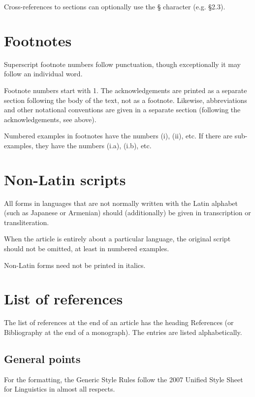 \documentclass[a4paper]{article}
\newcommand{\gsrex}[1]{{\color{blue}#1}}
\begin{document}
Cross-references to sections can optionally use the \gsrex{§}
character (e.g. \gsrex{§2.3}).

\section{Footnotes}\label{sec:footnotes}

Superscript footnote numbers follow punctuation, though exceptionally it
may follow an individual word.

Footnote numbers start with \gsrex{1}. The
acknowledgements are printed as a separate section following the body of
the text, not as a footnote. Likewise, abbreviations and other
notational conventions are given in a separate section (following the
acknowledgements, see  above).

Numbered examples in footnotes have the
numbers \gsrex{(i)}, 
\gsrex{(ii)}, etc. If there are sub- examples, they have the
numbers \gsrex{(i.a)}, 
\gsrex{(i.b)}, etc.

\section{Non-Latin scripts}\label{sec:non-latin-scripts}

All forms in languages that are not normally written with the Latin
alphabet (such as Japanese or Armenian) should (additionally) be given
in transcription or transliteration.

When the article is entirely about
a particular language, the original script should not be omitted, at
least in numbered examples. 

Non-Latin forms need not be printed in
italics.

\section{List of references}\label{sec:listofreferences}

The list of references at the end of an article has the heading
\gsrex{References} (or \gsrex{Bibliography} at the end of a monograph). The entries are
listed alphabetically.

\subsection{General points}\label{sec:general-points}

For the formatting, the Generic Style Rules follow the 2007 Unified
Style Sheet for Linguistics in almost all respects. 
\end{document}

